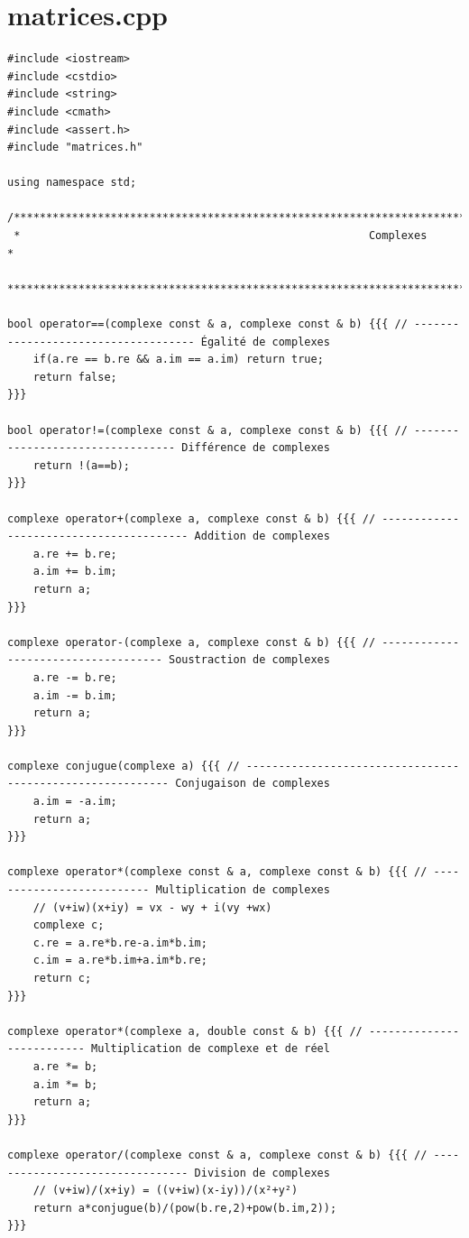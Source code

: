 \documentclass[a4paper]{article}
\begin{document}
\section{matrices.cpp}

\begin{verbatim}
#include <iostream>
#include <cstdio>
#include <string>
#include <cmath>
#include <assert.h>
#include "matrices.h"

using namespace std;

/********************************************************************************************************************** 
 *                                                      Complexes                                                     * 
 **********************************************************************************************************************/

bool operator==(complexe const & a, complexe const & b) {{{ // ------------------------------------ Égalité de complexes
    if(a.re == b.re && a.im == a.im) return true;
    return false;
}}}

bool operator!=(complexe const & a, complexe const & b) {{{ // --------------------------------- Différence de complexes
    return !(a==b);
}}}

complexe operator+(complexe a, complexe const & b) {{{ // ---------------------------------------- Addition de complexes
    a.re += b.re;
    a.im += b.im;
    return a;
}}}

complexe operator-(complexe a, complexe const & b) {{{ // ------------------------------------ Soustraction de complexes
    a.re -= b.re;
    a.im -= b.im;
    return a;
}}}

complexe conjugue(complexe a) {{{ // ---------------------------------------------------------- Conjugaison de complexes
    a.im = -a.im;
    return a;
}}}

complexe operator*(complexe const & a, complexe const & b) {{{ // -------------------------- Multiplication de complexes
    // (v+iw)(x+iy) = vx - wy + i(vy +wx)
    complexe c;
    c.re = a.re*b.re-a.im*b.im;
    c.im = a.re*b.im+a.im*b.re;
    return c;
}}}

complexe operator*(complexe a, double const & b) {{{ // -------------------------- Multiplication de complexe et de réel
    a.re *= b;
    a.im *= b;
    return a;
}}}

complexe operator/(complexe const & a, complexe const & b) {{{ // -------------------------------- Division de complexes
    // (v+iw)/(x+iy) = ((v+iw)(x-iy))/(x²+y²)
    return a*conjugue(b)/(pow(b.re,2)+pow(b.im,2));
}}}


\end{verbatim}
\end{document}
